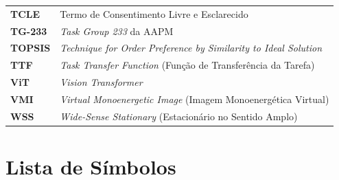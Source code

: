 \documentclass[
  12pt,
  a4paper,
  oneside
]{report}
\begin{document}
\begin{longtable}{ll}
\textbf{TCLE} & Termo de Consentimento Livre e Esclarecido \\
\textbf{TG-233} & \emph{Task Group 233} da AAPM \\
\textbf{TOPSIS} & \emph{Technique for Order Preference by Similarity to Ideal Solution} \\
\textbf{TTF} & \emph{Task Transfer Function} (Função de Transferência da Tarefa) \\
\textbf{ViT} & \emph{Vision Transformer} \\
\textbf{VMI} & \emph{Virtual Monoenergetic Image} (Imagem Monoenergética Virtual) \\
\textbf{WSS} & \emph{Wide-Sense Stationary} (Estacionário no Sentido Amplo) \\
\bottomrule
\end{longtable}
\clearpage

\chapter*{Lista de Símbolos}
\end{document}
